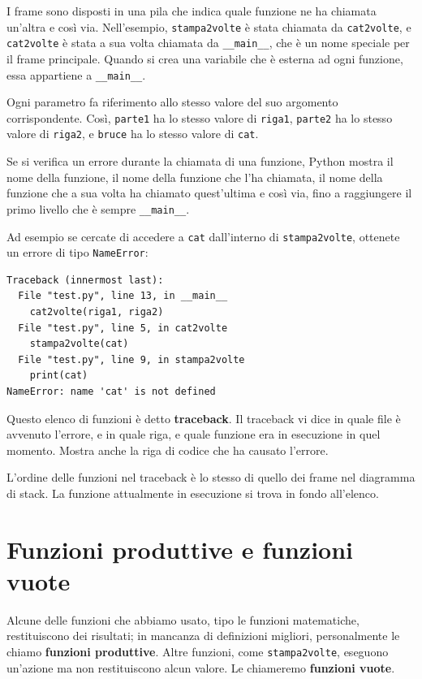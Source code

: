 \documentclass[10pt]{book}
\begin{document}
I frame sono disposti in una pila che indica quale funzione ne ha chiamata un'altra e così via. Nell'esempio, \verb"stampa2volte" è stata chiamata da \verb"cat2volte", e \verb"cat2volte" è stata a sua volta chiamata da 
\verb"__main__", che è un nome speciale per il frame principale. Quando si crea una variabile che è esterna ad ogni funzione, essa appartiene a 
\verb"__main__".

Ogni parametro fa riferimento allo stesso valore del suo argomento corrispondente. Così, {\tt parte1} ha lo stesso valore di
{\tt riga1}, {\tt parte2} ha lo stesso valore di {\tt riga2},
e {\tt bruce} ha lo stesso valore di {\tt cat}.

Se si verifica un errore durante la chiamata di una funzione, Python mostra il nome della funzione, il nome della funzione che l'ha chiamata, il nome della funzione che a sua volta ha chiamato quest'ultima e così via, fino a raggiungere il primo livello che è sempre \verb"__main__".

Ad esempio se cercate di accedere a {\tt cat} dall'interno di
\verb"stampa2volte", ottenete un errore di tipo {\tt NameError}:

\begin{verbatim}
Traceback (innermost last):
  File "test.py", line 13, in __main__
    cat2volte(riga1, riga2)
  File "test.py", line 5, in cat2volte
    stampa2volte(cat)
  File "test.py", line 9, in stampa2volte
    print(cat)
NameError: name 'cat' is not defined
\end{verbatim}
%
Questo elenco di funzioni è detto {\bf traceback}. Il traceback vi dice in quale file è avvenuto l'errore, e in quale riga, e quale funzione era in esecuzione in quel momento. Mostra anche la riga di codice che ha causato l'errore.

L'ordine delle funzioni nel traceback è lo stesso di quello dei frame nel diagramma di stack. La funzione attualmente in esecuzione si trova in fondo all'elenco.


\section{Funzioni produttive e funzioni vuote}

Alcune delle funzioni che abbiamo usato, tipo le funzioni matematiche, restituiscono dei risultati; in mancanza di definizioni migliori, personalmente le chiamo {\bf funzioni produttive}.  Altre funzioni, come \verb"stampa2volte", eseguono un'azione ma non restituiscono alcun valore. Le chiameremo {\bf funzioni vuote}.
\end{document}
